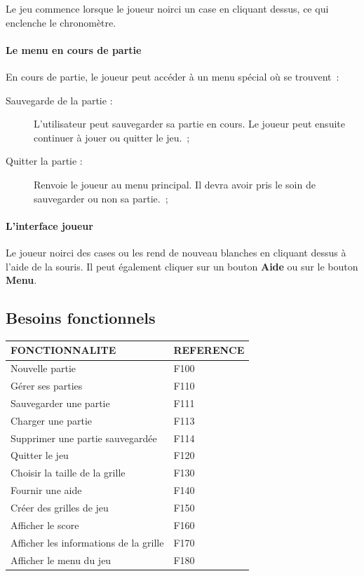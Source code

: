 \documentclass[11pt]{article}
\begin{document}
Le jeu commence lorsque le joueur noirci un case en cliquant dessus, ce qui enclenche le chronomètre. 

\paragraph{Le menu en cours de partie}

En cours de partie, le joueur peut accéder à un menu spécial où se trouvent~:


\begin{description}
    \item [Sauvegarde de la partie : ]L'utilisateur peut sauvegarder sa partie en cours. Le joueur peut ensuite
        continuer à jouer ou quitter le jeu.~;
   \item [Quitter la partie : ]Renvoie le joueur au menu principal. Il devra avoir pris le soin de sauvegarder ou non sa
       partie.~;
\end{description}


\paragraph{L'interface joueur}

Le joueur noirci des cases ou les rend de nouveau blanches en cliquant dessus à l'aide de la souris. Il peut également cliquer sur un bouton \textbf{Aide} ou sur le bouton \textbf{Menu}.





\subsection{Besoins fonctionnels}

\vspace{0,5cm}
\small
\begin{tabular}{|p{10cm}|p{3cm}|}
	\hline
	\textbf{FONCTIONNALITE} & \textbf{REFERENCE}\\
	\hline
	\hline
		Nouvelle partie 											& F100 \\	\cline{1-2}
		Gérer ses parties											& F110 \\	\cline{1-2}	
		Sauvegarder une partie 										& F111 \\	\cline{1-2}	
		Charger une partie 											& F113 \\	\cline{1-2}	
		Supprimer une partie sauvegardée							& F114 \\	\cline{1-2}	
		Quitter le jeu												& F120 \\	\cline{1-2}	
		Choisir la taille de la grille								& F130 \\	\cline{1-2}
		Fournir une aide 											& F140 \\	\cline{1-2}
		Créer des grilles de jeu									& F150 \\	\cline{1-2}
		Afficher le score											& F160 \\	\cline{1-2}
		Afficher les informations de la grille						& F170 \\	\cline{1-2}
		Afficher le menu du jeu 									& F180 \\	\cline{1-2}
	\hline
	\end{tabular}
\normalsize \\
\end{document}
